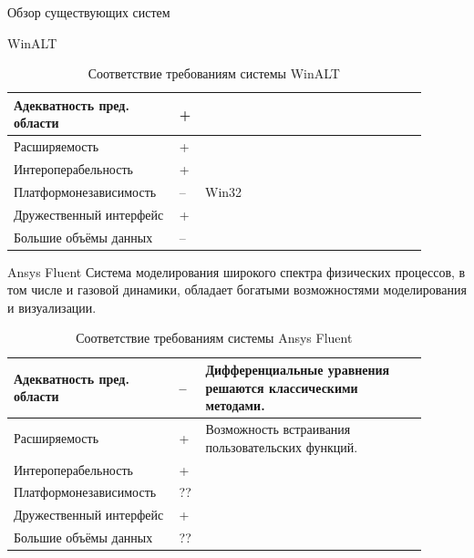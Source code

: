 \documentclass[a4paper,12pt]{extarticle}
\begin{document}
\begin{section}{Обзор существующих систем}
\begin{subsection}{WinALT}
    \begin{table}[h]
        \caption{Соответствие требованиям системы WinALT}
        \label{tabular:winalt}
        \begin{center}
            \begin{tabular}{|p{0.35\linewidth}|p{0.05\linewidth}|p{0.5\linewidth}|} \hline
                Адекватность пред. области & + & \\ \hline
                Расширяемость              & + & \\ \hline
                Интероперабельность        & + & \\ \hline
                Платформонезависимость     & -- & Win32 \\ \hline
                Дружественный интерфейс    & + & \\ \hline
                Большие объёмы данных      & -- & \\ \hline
            \end{tabular}
        \end{center}
    \end{table}
\end{subsection}

\begin{subsection}{Ansys Fluent}
    Система моделирования широкого спектра физических процессов, в том числе и газовой динамики, обладает богатыми возможностями моделирования и визуализации.

    \begin{table}[h]
        \caption{Соответствие требованиям системы Ansys Fluent}
        \label{tabular:ansysfluent}
        \begin{center}
            \begin{tabular}{|p{0.35\linewidth}|p{0.05\linewidth}|p{0.5\linewidth}|} \hline
                Адекватность пред. области & -- & Дифференциальные уравнения решаются классическими методами. \\ \hline
                Расширяемость              & + & Возможность встраивания пользовательских функций. \\ \hline
                Интероперабельность        & + & \\ \hline
                Платформонезависимость     & ?? & \\ \hline
                Дружественный интерфейс    & + & \\ \hline
                Большие объёмы данных      & ?? & \\ \hline
            \end{tabular}
        \end{center}
    \end{table}
\end{subsection}


\end{section}
\end{document}
